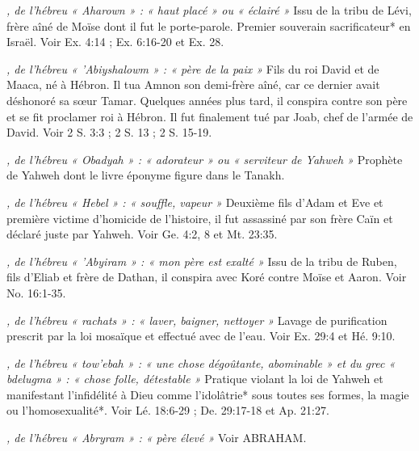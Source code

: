 \begin{multicols}{2}

\textit{, de l'hébreu « Aharown » : « haut placé » ou « éclairé »}\newline
Issu de la tribu de Lévi, frère aîné de Moïse dont il fut le porte-parole. Premier souverain sacrificateur* en Israël. Voir Ex. 4:14 ; Ex. 6:16-20 et Ex. 28.

\textit{, de l'hébreu « 'Abiyshalowm » : « père de la paix »}\newline
Fils du roi David et de Maaca, né à Hébron. Il tua Amnon son demi-frère aîné, car ce dernier avait déshonoré sa sœur Tamar. Quelques années plus tard, il conspira contre son père et se fit proclamer roi à Hébron. Il fut finalement tué par Joab, chef de l'armée de David. Voir 2 S. 3:3 ; 2 S. 13 ; 2 S. 15-19.

\textit{, de l'hébreu « Obadyah » : « adorateur » ou « serviteur de Yahweh »}\newline
Prophète de Yahweh dont le livre éponyme figure dans le Tanakh.

\textit{, de l'hébreu « Hebel » : « souffle, vapeur »}\newline
Deuxième fils d'Adam et Eve et première victime d'homicide de l'histoire, il fut assassiné par son frère Caïn et déclaré juste par Yahweh. Voir Ge. 4:2, 8 et Mt. 23:35.

\textit{, de l'hébreu « 'Abyiram » : « mon père est exalté »}\newline
Issu de la tribu de Ruben, fils d'Eliab et frère de Dathan, il conspira avec Koré contre Moïse et Aaron. Voir No. 16:1-35.

\textit{, de l'hébreu « rachats » : « laver, baigner, nettoyer »}\newline
Lavage de purification prescrit par la loi mosaïque et effectué avec de l'eau. Voir Ex. 29:4 et Hé. 9:10.

\textit{, de l'hébreu « tow'ebah » : « une chose dégoûtante, abominable » et du grec « bdelugma » : « chose folle, détestable »}\newline
Pratique violant la loi de Yahweh et manifestant l'infidélité à Dieu comme l'idolâtrie* sous toutes ses formes, la magie ou l'homosexualité*. Voir Lé. 18:6-29 ; De. 29:17-18 et Ap. 21:27.

\textit{, de l'hébreu « Abryram » : « père élevé »}\newline
Voir ABRAHAM.


\end{multicols}
